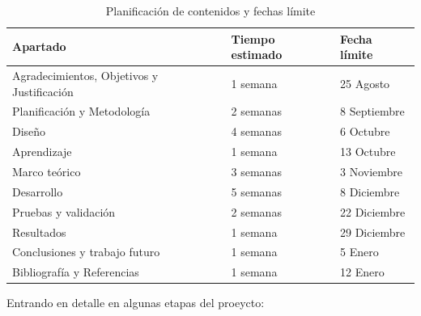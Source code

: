 \begin{table}[H]
    \centering
    \begin{tabular}{|l|l|l|}
    \hline
    \textbf{Apartado} & \textbf{Tiempo estimado} & \textbf{Fecha límite} \\ \hline
    Agradecimientos, Objetivos y Justificación & 1 semana & 25 Agosto \\ \hline
    Planificación y Metodología & 2 semanas & 8 Septiembre \\ \hline
    Diseño & 4 semanas & 6 Octubre \\ \hline
    Aprendizaje & 1 semana & 13 Octubre \\ \hline
    Marco teórico & 3 semanas & 3 Noviembre \\ \hline
    Desarrollo & 5 semanas & 8 Diciembre \\ \hline
    Pruebas y validación & 2 semanas & 22 Diciembre \\ \hline
    Resultados & 1 semana & 29 Diciembre \\ \hline
    Conclusiones y trabajo futuro & 1 semana & 5 Enero \\ \hline
    Bibliografía y Referencias & 1 semana & 12 Enero \\ \hline
    \end{tabular}
    \caption{Planificación de contenidos y fechas límite}
\end{table}

Entrando en detalle en algunas etapas del proeycto:

